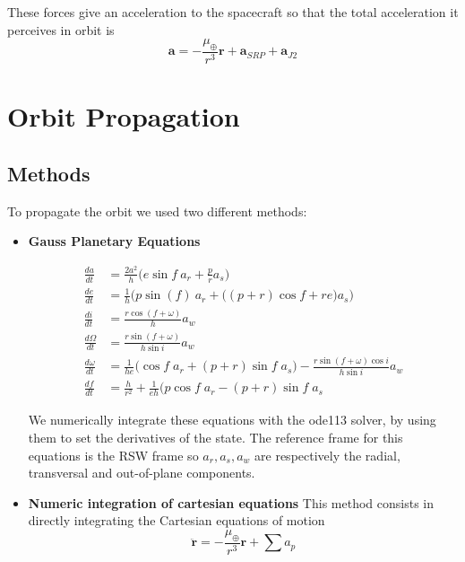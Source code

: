 \documentclass[11pt,a4paper]{report}
\renewcommand{\vec}[1]{\mathbf{#1}}
\begin{document}
These forces give an acceleration to the spacecraft so that the total acceleration it perceives in orbit is
\begin{equation}
    \vec{a} = - \frac{\mu_{\oplus}}{r^3}\vec{r} + \vec{a}_{SRP} + \vec{a}_{J2}
\end{equation}

\section{Orbit Propagation}
\subsection{Methods}
To propagate the orbit we used two different methods:
\begin{itemize}
    \item \textbf{Gauss Planetary Equations}
    \par
    \begin{align*}
        \frac{da}{dt}&=\frac{2a^2}{h}\Big(e\sin f \: a_r +\frac{p}{r}a_s\Big)\\
        \frac{de}{dt}&=\frac{1}{h}\Big(p\sin(f) \: a_r+ \Big( (p+r)\cos f +re \Big) a_s\Big)\\
        \frac{di}{dt} &= \frac{r\cos(f+\omega)}{h}a_w\\
        \frac{d\Omega}{dt}&=\frac{r\sin (f+\omega) }{h \sin i}a_w\\
        \frac{d\omega}{dt}&=\frac{1}{he} \Big( \cos f \; a_r + (p+r)\sin f \; a_s \Big ) - \frac{r\sin(f+\omega)\cos i}{h\sin i} a_w\\
        \frac{df}{dt} &= \frac{h}{r^2} + \frac{1}{eh} \Big(p \cos f \; a_r - (p+r)\sin f \; a_s 
    \end{align*}

    \par
    We numerically integrate these equations with the ode113 solver, by using them to set the derivatives of the state.
    The reference frame for this equations is the RSW frame so $a_r, a_s, a_w$ are respectively the  radial, transversal and out-of-plane components. \cite{RSW_Curtis} \cite{RSW_Vallado} \cite{RSW_Battin}
    
    \item \textbf{Numeric integration of cartesian equations}
    This method consists in directly integrating the Cartesian equations of motion
    \begin{equation}
        \vec{\ddot{r}} = - \frac{\mu_{\oplus}}{r^3}\vec{r} + \sum{a_{p}}
    \end{equation}
    
\end{itemize}
\end{document}
